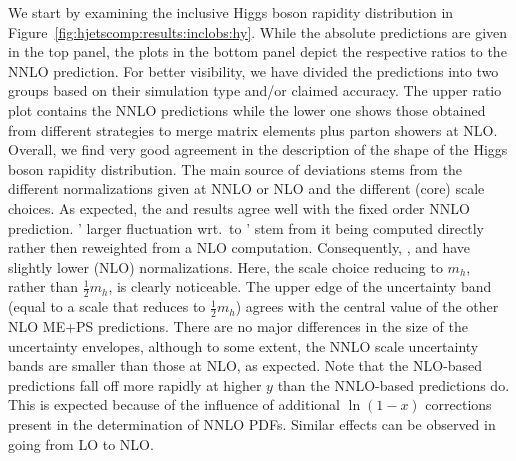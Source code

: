 We start by examining the inclusive Higgs boson rapidity distribution in
Figure~\ref{fig:hjetscomp:results:inclobs:hy}. While the absolute
predictions are given in the top panel, the plots in the bottom panel
depict the respective ratios to the NNLO prediction. For better
visibility, we have divided the predictions into two groups based on
their simulation type and/or claimed accuracy. The upper ratio plot
contains the NNLO predictions while the lower one shows those obtained
from different strategies to merge matrix elements plus parton showers
at NLO. Overall, we find very good agreement in the description of the
shape of the Higgs boson rapidity distribution. The main source of deviations stems
from the different normalizations given at NNLO or NLO and the
different (core) scale choices. As expected, the \Sherpa \NNLOPS and
\Powheg \NNLOPS results agree well with the fixed order NNLO prediction. 
\Sherpa \NNLOPS' larger fluctuation wrt.\ to \Powheg \NNLOPS' stem from 
it being computed directly rather then reweighted from a NLO computation. 
Consequently, \MGaMC, \Sherpa \MEPSatNLO and \Herwig have slightly lower (NLO)
normalizations.  Here, the \MGaMC scale choice reducing to
$m_h$, rather than $\tfrac{1}{2}m_h$, is clearly noticeable. The upper edge of
the \MGaMC uncertainty band (equal to a scale that reduces to $\tfrac{1}{2}m_h$)
agrees with the central value of the other NLO ME+PS
predictions. There are no major differences in the size of the
uncertainty envelopes, although to some extent, the NNLO scale
uncertainty bands are smaller than those at NLO, as expected. Note
that the NLO-based predictions fall off more rapidly at higher $y$
than the NNLO-based predictions do. This is expected because of the
influence of additional $\ln(1-x)$ corrections present in the
determination of NNLO PDFs. Similar effects can be observed in going
from LO to NLO.

